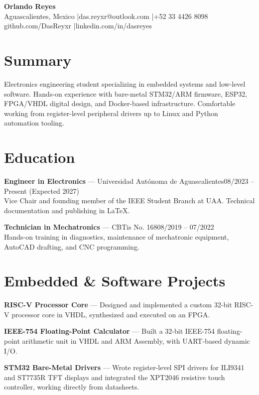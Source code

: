 \documentclass[10.5pt,a4paper]{article}
\begin{document}
\begin{center}
	{\LARGE \textbf{Orlando Reyes}}\\[0.3em]
	Aguascalientes, Mexico \quad|\quad das.reyxr@outlook.com \quad|\quad +52 33 4426 8098\\
	github.com/DasReyxr \quad|\quad linkedin.com/in/dasreyes
\end{center}

\section*{Summary}
Electronics engineering student specializing in embedded systems and low-level software. Hands-on experience with bare-metal STM32/ARM firmware, ESP32, FPGA/VHDL digital design, and Docker-based infrastructure. Comfortable working from register-level peripheral drivers up to Linux and Python automation tooling.

\section*{Education}

\textbf{Engineer in Electronics} --- Universidad Autónoma de Aguascalientes\hfill 08/2023 -- Present (Expected 2027)\\
Vice Chair and founding member of the IEEE Student Branch at UAA. Technical documentation and publishing in LaTeX.

\vspace{0.2em}
\textbf{Technician in Mechatronics} --- CBTis No. 168\hfill 08/2019 -- 07/2022\\
Hands-on training in diagnostics, maintenance of mechatronic equipment, AutoCAD drafting, and CNC programming.

\section*{Embedded \& Software Projects}
\textbf{RISC-V Processor Core} --- Designed and implemented a custom 32-bit RISC-V processor core in VHDL, synthesized and executed on an FPGA.

\vspace{0.15em}
\textbf{IEEE-754 Floating-Point Calculator} --- Built a 32-bit IEEE-754 floating-point arithmetic unit in VHDL and ARM Assembly, with UART-based dynamic I/O.

\vspace{0.15em}
\textbf{STM32 Bare-Metal Drivers} --- Wrote register-level SPI drivers for ILI9341 and ST7735R TFT displays and integrated the XPT2046 resistive touch controller, working directly from datasheets.
\end{document}
